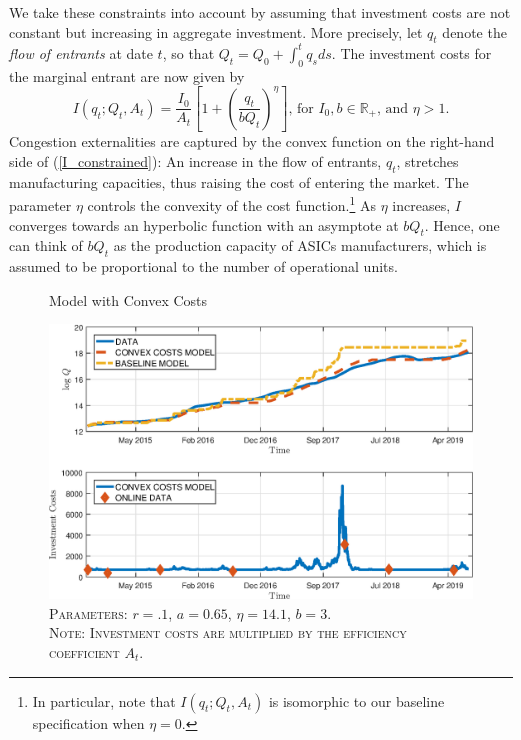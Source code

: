 \documentclass[12pt, a4paper]{article}
\begin{document}
We take these constraints into account by assuming that investment costs are not constant
but increasing in aggregate investment. More precisely, let $q_t$ denote
the \emph{flow of entrants} at date $t$, so that $Q_t=Q_0+\int_{0}^{t}q_sds$. The investment costs for the marginal entrant
are now given by
\begin{equation}
I\left(q_t;Q_t,A_t\right) =\frac{I_0}{A_t}\left[1+\left(\frac{q_t}{bQ_t}\right)^{\eta }\right]
\text{, for }I_0,b \in \mathbb{R}_+ \text{, and }\eta>1.
\label{I_constrained}
\end{equation}%
Congestion externalities are captured by the convex function on the right-hand side of (\ref{I_constrained}):
An increase in the flow of entrants, $q_t$, stretches manufacturing capacities, thus raising the cost
of entering the market. The parameter $\eta$ controls the convexity of the cost function.\footnote{In particular, note that
$I\left(q_t;Q_t,A_t\right)$ is isomorphic to our baseline specification when $\eta =0$.} As $\eta$ increases,
$I$ converges towards an hyperbolic function with an asymptote at $bQ_t$. Hence, one can think of $bQ_t$
as the production capacity of ASICs manufacturers, which is assumed to be proportional to the number of operational units.


\begin{figure}[t]
\caption{Model with Convex Costs}
\label{fig:hashrate_bubble}
\centering
\includegraphics[scale=.775]{images/Fig_bubble_constrained.eps}
\caption*{\footnotesize{\textsc{Parameters: $r=.1$, $a=0.65$, $\eta=14.1$, $b=3$.
        \\ Note: Investment costs are multiplied by the efficiency coefficient $A_t$.}}}
\end{figure}
\end{document}
